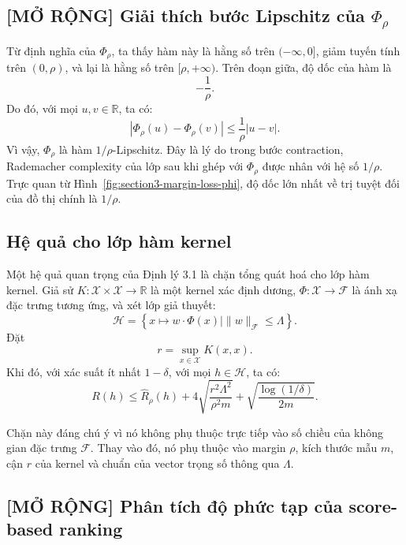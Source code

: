 \subsection{[MỞ RỘNG] Giải thích bước Lipschitz của \texorpdfstring{\(\Phi_{\rho}\)}{Phi rho}}

Từ định nghĩa của \(\Phi_{\rho}\), ta thấy hàm này là hằng số trên \((-\infty,0]\), giảm tuyến tính trên \((0,\rho)\), và lại là hằng số trên \([\rho,+\infty)\). Trên đoạn giữa, độ dốc của hàm là
\[
    -\frac{1}{\rho}.
\]
Do đó, với mọi \(u,v\in\mathbb{R}\), ta có:
\[
    |\Phi_{\rho}(u)-\Phi_{\rho}(v)|
    \leq
    \frac{1}{\rho}|u-v|.
\]
Vì vậy, \(\Phi_{\rho}\) là hàm \(1/\rho\)-Lipschitz. Đây là lý do trong bước contraction, Rademacher complexity của lớp sau khi ghép với \(\Phi_{\rho}\) được nhân với hệ số \(1/\rho\). Trực quan từ Hình~\ref{fig:section3-margin-loss-phi}, độ dốc lớn nhất về trị tuyệt đối của đồ thị chính là \(1/\rho\).

\subsection{Hệ quả cho lớp hàm kernel}

Một hệ quả quan trọng của Định lý 3.1 là chặn tổng quát hoá cho lớp hàm kernel. Giả sử \(K:\mathcal{X}\times\mathcal{X}\rightarrow\mathbb{R}\) là một kernel xác định dương, \(\Phi:\mathcal{X}\rightarrow\mathcal{F}\) là ánh xạ đặc trưng tương ứng, và xét lớp giả thuyết:
\[
    \mathcal{H}
    =
    \left\{
        x\mapsto w\cdot \Phi(x)
        \mid
        \|w\|_{\mathcal{F}}\leq \Lambda
    \right\}.
\]
Đặt
\[
    r=\sup_{x\in\mathcal{X}}K(x,x).
\]
Khi đó, với xác suất ít nhất \(1-\delta\), với mọi \(h\in\mathcal{H}\), ta có:
\begin{equation}
    R(h)
    \leq
    \widehat{R}_{\rho}(h)
    +
    4
    \sqrt{
        \frac{r^2\Lambda^2}{\rho^2 m}
    }
    +
    \sqrt{
        \frac{\log(1/\delta)}{2m}
    }.
    \label{eq:section3-kernel-margin-bound}
\end{equation}

Chặn này đáng chú ý vì nó không phụ thuộc trực tiếp vào số chiều của không gian đặc trưng \(\mathcal{F}\). Thay vào đó, nó phụ thuộc vào margin \(\rho\), kích thước mẫu \(m\), cận \(r\) của kernel và chuẩn của vector trọng số thông qua \(\Lambda\).

\subsection{[MỞ RỘNG] Phân tích độ phức tạp của score-based ranking}

